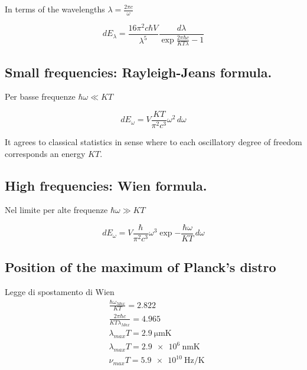 In terms of the wavelengths $\lambda=\frac{2\pi c}{\omega}$

\begin{equation*}
dE_{\lambda}=\frac{16\pi^2c\hbar V}{\lambda^5}\frac{d\lambda}{\exp{\frac{2\pi\hbar c}{KT\lambda}}-1}
\end{equation*}

\subsection{Small frequencies: Rayleigh-Jeans formula.}

Per basse frequenze $\hbar\omega\ll KT$

\begin{equation*}
dE_{\omega}=V\frac{KT}{\pi^2 c^3}\omega^2\,d\omega
\end{equation*}

It agrees to classical statistics in sense where to each oscillatory degree of freedom corresponds an energy $KT$.

\subsection{High frequencies: Wien formula.}

Nel limite per alte frequenze  $\hbar\omega\gg KT$

\begin{equation*}
dE_{\omega}=V\frac{\hbar}{\pi^2 c^3}\omega^3\exp{-\frac{\hbar\omega}{KT}}\,d\omega
\end{equation*}


\subsection{Position of the maximum of Planck's distro}

\begin{usefull}{Legge di spostamento di Wien}
\begin{align*}
&\frac{\hbar\omega_{Max}}{KT}=2.822\\
&\frac{2\pi\hbar c}{KT\lambda_{Max}}=4.965\\
&\lambda_{max}T=\SI{2.9}{\micro\meter\kelvin}\\
&\lambda_{max}T=\SI{2.9e6}{\nano\meter\kelvin}\\
&\nu_{max}T=\SI{5.9e10}{\hertz\per\kelvin}
\end{align*}

\end{usefull}


